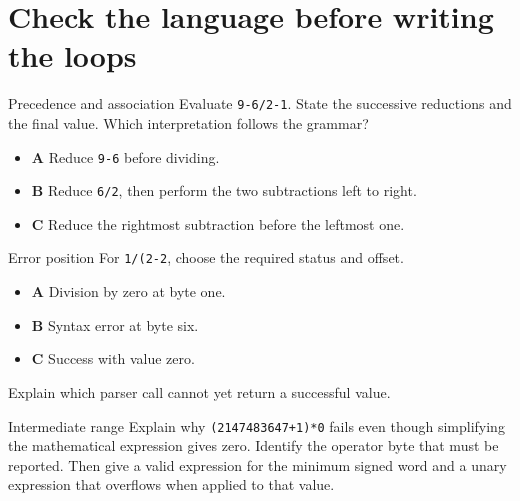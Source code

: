 \section{Check the language before writing the loops}\label{expression-questions}
\begin{MARSExercise}{Precedence and association}
  Evaluate \texttt{9-6/2-1}. State the successive reductions and the final value.
  Which interpretation follows the grammar?
  \begin{itemize}
    \item \textbf{A} Reduce \texttt{9-6} before dividing.
    \item \textbf{B} Reduce \texttt{6/2}, then perform the two subtractions left to right.
    \item \textbf{C} Reduce the rightmost subtraction before the leftmost one.
  \end{itemize}
\end{MARSExercise}
\begin{MARSExercise}{Error position}
  For \texttt{1/(2-2}, choose the required status and offset.
  \begin{itemize}
    \item \textbf{A} Division by zero at byte one.
    \item \textbf{B} Syntax error at byte six.
    \item \textbf{C} Success with value zero.
  \end{itemize}
  Explain which parser call cannot yet return a successful value.
\end{MARSExercise}
\begin{MARSExercise}{Intermediate range}
  Explain why \texttt{(2147483647+1)*0} fails even though simplifying the mathematical
  expression gives zero. Identify the operator byte that must be reported. Then give
  a valid expression for the minimum signed word and a unary expression that overflows
  when applied to that value.
\end{MARSExercise}
